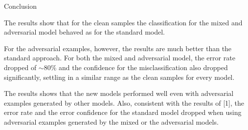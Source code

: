\begin{tframe}{Conclusion}

The results show that for the clean samples the classification for the mixed and adversarial model behaved as for the standard model. 

\vspace{0.1in}

For the adversarial examples, however, the results are much better than the standard approach. For both the mixed and adversarial model, the error rate dropped of $\sim 80\%$ and the confidence for the misclassification also dropped significantly, settling in a similar range as the clean samples for every model.

\vspace{0.1in}

The results shows that the new models performed well even with adversarial examples generated by other models. Also, consistent with the results of [1], the error rate and the error confidence for the standard model dropped when using adversarial examples generated by the mixed or the adversarial models.

\end{tframe}